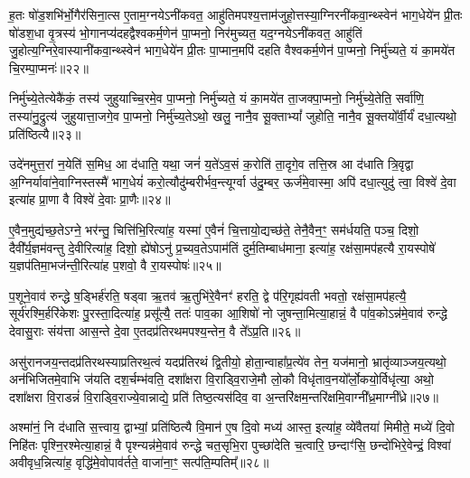 ह॒तः षो॑ड॒शभि॑र्भो॒गैर॑सिना॒त्स ए॒ताम॒ग्नये\-ऽनी॑कवत॒ आहु॑तिमपश्य॒त्ताम॑जुहो॒त्तस्या॒ग्निरनी॑कवा॒न्थ्स्वेन॑ भाग॒धेये॑न प्री॒तः षो॑डश॒धा वृ॒त्रस्य॑ भो॒गानप्य॑दहद्वैश्वकर्म॒णेन॑ पा॒प्मनो॒ निर॑मुच्यत॒ यद॒ग्नये\-ऽनी॑कवत॒ आहु॑तिं जु॒होत्य॒ग्निरे॒वास्यानी॑कवा॒न्थ्स्वेन॑ भाग॒धेये॑न प्री॒तः पा॒प्मान॒मपि॑ दहति वैश्वकर्म॒णेन॑ पा॒प्मनो॒ निर्मु॑च्यते॒ यं का॒मये॑त चि॒रम्पा॒प्मनः॑॥२२॥

निर्मु॑च्ये॒तेत्येकै॑कं॒ तस्य॑ जुहुयाच्चि॒रमे॒व पा॒प्मनो॒ निर्मु॑च्यते॒ यं का॒मये॑त ता॒जक्पा॒प्मनो॒ निर्मु॑च्ये॒तेति॒ सर्वा॑णि॒ तस्या॑नु॒द्रुत्य॑ जुहुयात्ता॒जगे॒व पा॒प्मनो॒ निर्मु॑च्य॒ते\-ऽथो॒ खलु॒ नानै॒व सू॒क्ता\-भ्यां᳚ जुहोति॒ नानै॒व सू॒क्तयो᳚र्वी॒र्यं॑ दधा॒त्यथो॒ प्रति॑ष्ठित्यै॥२३॥

{\anuvakamend[{दे॒वाः प्रा॑जाप॒त्यो वृ॒त्रश्चि॒रं पा॒प्मन॑श्चत्वारि॒ꣳ॒शच्च॑॥५॥}]}

उदे॑नमुत्त॒रां न॒येति॑ स॒मिध॒ आ द॑धाति॒ यथा॒ जनं॑ य॒ते॑\-ऽव॒सं क॒रोति॑ ता॒दृगे॒व तत्ति॒स्र आ द॑धाति त्रि॒वृद्वा अ॒ग्निर्यावा॑ने॒वाग्निस्तस्मै॑ भाग॒धेयं॑ करो॒त्यौदु॑म्बरीर्भव॒न्त्यूर्ग्वा उ॑दु॒म्बर॒ ऊर्ज॑मे॒वास्मा॒ अपि॑ दधा॒त्युदु॑ त्वा॒ विश्वे॑ दे॒वा इत्या॑ह प्रा॒णा वै विश्वे॑ दे॒वाः प्रा॒णैः॥२४॥

ए॒वैन॒मुद्य॑च्छ॒ते\-ऽग्ने॒ भर॑न्तु॒ चित्ति॑भि॒रित्या॑ह॒ यस्मा॑ ए॒वैनं॑ चि॒त्तायो॒द्यच्छ॑ते॒ तेनै॒वैन॒ꣳ॒ सम॑र्धयति॒ पञ्च॒ दिशो॒ दैवी᳚र्य॒ज्ञम॑वन्तु दे॒वीरित्या॑ह॒ दिशो॒ ह्ये॑षो\-ऽनु॑ प्र॒च्यव॒ते\-ऽपाम॑तिं दुर्म॒तिम्बाध॑माना॒ इत्या॑ह॒ रक्ष॑सा॒मप॑हत्यै रा॒यस्पोषे॑ य॒ज्ञप॑तिमा॒भज॑न्ती॒रित्या॑ह प॒शवो॒ वै रा॒यस्पोषः॑॥२५॥

प॒शूने॒वाव॑ रुन्द्धे ष॒ड्भिर्\mbox{}ह॑रति॒ षड्वा ऋ॒तव॑ ऋ॒तुभि॑रे॒वैनꣳ॑ हरति॒ द्वे प॑रि॒गृह्य॑वती भवतो॒ रक्ष॑सा॒मप॑हत्यै॒ सूर्य॑रश्मि॒र्\mbox{}हरि॑केशः पु॒रस्ता॒दित्या॑ह॒ प्रसू᳚त्यै॒ ततः॑ पाव॒का आ॒शिषो॑ नो जुषन्ता॒मित्या॒हान्नं॒ वै पा॑व॒को\-ऽन्न॑मे॒वाव॑ रुन्द्धे देवासु॒राः संय॑त्ता आस॒न्ते दे॒वा ए॒तदप्र॑तिरथमपश्य॒न्तेन॒ वै ते᳚\-ऽप्र॒ति॥२६॥

असु॑रानजय॒न्तदप्र॑तिरथस्याप्रतिरथ॒त्वं यदप्र॑तिरथं द्वि॒तीयो॒ होता॒न्वाहा᳚प्र॒त्ये॑व तेन॒ यज॑मानो॒ भ्रातृ॑व्याञ्जय॒त्यथो॒ अन॑भिजितमे॒वाभि ज॑यति दश॒र्चम्भ॑वति॒ दशा᳚क्षरा वि॒राड्वि॒राजे॒मौ लो॒कौ विधृ॑ताव॒नयो᳚र्लो॒कयो॒र्विधृ॑त्या॒ अथो॒ दशा᳚क्षरा वि॒राडन्नं॑ वि॒राड्वि॒राज्ये॒वान्नाद्ये॒ प्रति॑ तिष्ठ॒त्यस॑दिव॒ वा अ॒न्तरि॑क्षम॒न्तरि॑क्षमि॒वाग्नी᳚ध्र॒माग्नी᳚ध्रे॥२७॥

अश्मा॑नं॒ नि द॑धाति स॒त्त्वाय॒ द्वाभ्यां॒ प्रति॑ष्ठित्यै वि॒मान॑ ए॒ष दि॒वो मध्य॑ आस्त॒ इत्या॑ह॒ व्ये॑वैतया॑ मिमीते॒ मध्ये॑ दि॒वो निहि॑तः पृश्नि॒रश्मेत्या॒हान्नं॒ वै पृश्न्यन्न॑मे॒वाव॑ रुन्द्धे चत॒सृभि॒रा पुच्छा॑देति च॒त्वारि॒ छन्दाꣳ॑सि॒ छन्दो॑भिरे॒वेन्द्रं॒ विश्वा॑ अवीवृध॒न्नित्या॑ह॒ वृद्धि॑मे॒वोपाव॑र्तते॒ वाजा॑ना॒ꣳ॒ सत्प॑ति॒म्पतिम्᳚॥२८॥

